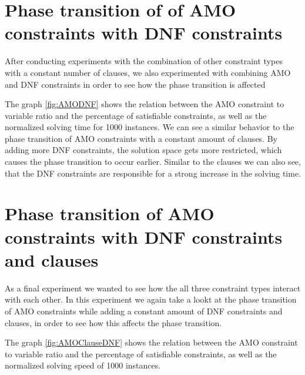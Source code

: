 \section{Phase transition of of AMO constraints with DNF constraints}

After conducting experiments with the combination of other constraint types with a constant number of clauses, we also experimented with combining AMO and DNF constraints in order to see how the phase transition is affected



The graph \ref{fig:AMODNF} shows the relation between the AMO constraint to variable ratio and the percentage of satisfiable constraints, as well as the normalized solving time for 1000 instances. We can see a similar behavior to the phase transition of AMO constraints with a constant amount of clauses. By adding more DNF constraints, the solution space gets more restricted, which causes the phase transition to occur earlier. Similar to the clauses we can also see, that the DNF constraints are responsible for a strong increase in the solving time.

\section{Phase transition of AMO constraints with DNF constraints and clauses}

As a final experiment we wanted to see how the all three constraint types interact with each other. In this experiment we again take a lookt at the phase transition of AMO constraints while adding a constant amount of DNF constraints and clauses, in order to see how this affects the phase transition.




The graph \ref{fig:AMOClauseDNF} shows the relation between the AMO constraint to variable ratio and the percentage of satisfiable constraints, as well as the normalized solving speed of 1000 instances.
